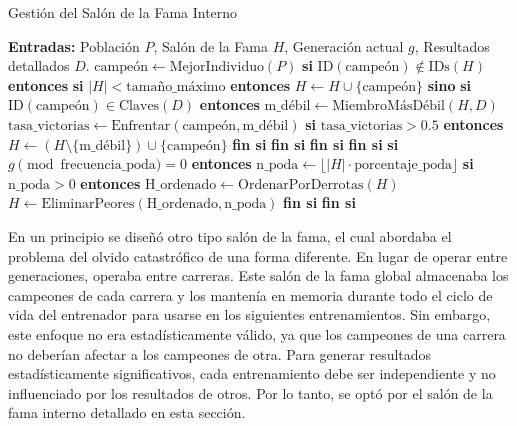 \begin{algorithm}[H]
    \caption{Gestión del Salón de la Fama Interno}
    \label{alg:hof_management}
    \begin{algorithmic}[1]
        \State {}
        \State \textbf{Entradas:} Población $P$, Salón de la Fama $H$, Generación actual $g$, Resultados detallados $D$.
        \State
        \State $\text{campeón} \leftarrow \text{MejorIndividuo}(P)$
        \State \textbf{si} $\text{ID}(\text{campeón}) \notin \text{IDs}(H)$ \textbf{entonces}
        \State \quad \textbf{si} $|H| < \text{tamaño\_máximo}$ \textbf{entonces}
        \State \qquad $H \leftarrow H \cup \{\text{campeón}\}$
        \State \quad \textbf{sino}
        \State \qquad \textbf{si} $\text{ID}(\text{campeón}) \in \text{Claves}(D)$ \textbf{entonces}
        \State \qquad \quad $\text{m\_débil} \leftarrow \text{MiembroMásDébil}(H, D)$
        \State \qquad \quad $\text{tasa\_victorias} \leftarrow \text{Enfrentar}(\text{campeón}, \text{m\_débil})$
        \State \qquad \quad \textbf{si} $\text{tasa\_victorias} > 0.5$ \textbf{entonces}
        \State \qquad \qquad $H \leftarrow (H \setminus \{\text{m\_débil}\}) \cup \{\text{campeón}\}$
        \State \qquad \quad \textbf{fin si}
        \State \qquad \textbf{fin si}
        \State \quad \textbf{fin si}
        \State \textbf{fin si}
        \State
        \State {}
        \State \textbf{si} $g \pmod{\text{frecuencia\_poda}} = 0$ \textbf{entonces}
        \State \quad $\text{n\_poda} \leftarrow \lfloor |H| \cdot \text{porcentaje\_poda} \rfloor$
        \State \quad \textbf{si} $\text{n\_poda} > 0$ \textbf{entonces}
        \State \qquad $\text{H\_ordenado} \leftarrow \text{OrdenarPorDerrotas}(H)$
        \State \qquad $H \leftarrow \text{EliminarPeores}(\text{H\_ordenado}, \text{n\_poda})$
        \State \quad \textbf{fin si}
        \State \textbf{fin si}
    \end{algorithmic}
\end{algorithm}

En un principio se diseñó otro tipo salón de la fama, el cual abordaba el problema del olvido catastrófico de una forma diferente. En lugar de operar entre generaciones, operaba entre carreras. Este salón de la fama global almacenaba los campeones de cada carrera y los mantenía en memoria durante todo el ciclo de vida del entrenador para usarse en los siguientes entrenamientos. Sin embargo, este enfoque no era estadísticamente válido, ya que los campeones de una carrera no deberían afectar a los campeones de otra. Para generar resultados estadísticamente significativos, cada entrenamiento debe ser independiente y no influenciado por los resultados de otros. Por lo tanto, se optó por el salón de la fama interno detallado en esta sección.

